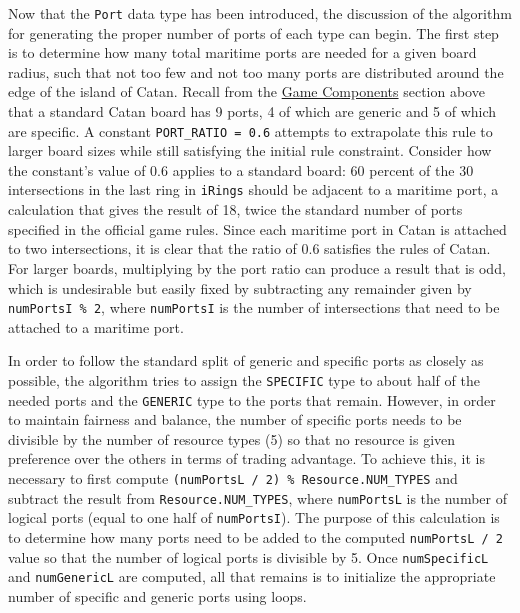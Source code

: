 \documentclass[pageno]{jpaper}
\begin{document}
\begin{doublespacing}
Now that the \lstinline$Port$ data type has been introduced, the discussion of the algorithm for generating the proper number of ports of each type can begin. The first step is to determine how many total maritime ports are needed for a given board radius, such that not too few and not too many ports are distributed around the edge of the island of Catan. Recall from the \hyperlink{sec:game_components}{Game Components} section above that a standard Catan board has 9 ports, 4 of which are generic and 5 of which are specific. A constant \lstinline$PORT_RATIO = 0.6$ attempts to extrapolate this rule to larger board sizes while still satisfying the initial rule constraint. Consider how the constant's value of 0.6 applies to a standard board: 60 percent of the 30 intersections in the last ring in \lstinline$iRings$ should be adjacent to a maritime port, a calculation that gives the result of 18, twice the standard number of ports specified in the official game rules. Since each maritime port in Catan is attached to two intersections, it is clear that the ratio of 0.6 satisfies the rules of Catan. For larger boards, multiplying by the port ratio can produce a result that is odd, which is undesirable but easily fixed by subtracting any remainder given by \lstinline$numPortsI % 2$, where \lstinline$numPortsI$ is the number of intersections that need to be attached to a maritime port.

In order to follow the standard split of generic and specific ports as closely as possible, the algorithm tries to assign the \lstinline$SPECIFIC$ type to about half of the needed ports and the \lstinline$GENERIC$ type to the ports that remain. However, in order to maintain fairness and balance, the number of specific ports needs to be divisible by the number of resource types (5) so that no resource is given preference over the others in terms of trading advantage. To achieve this, it is necessary to first compute \lstinline$(numPortsL / 2) % Resource.NUM_TYPES$ and subtract the result from \lstinline$Resource.NUM_TYPES$, where \lstinline$numPortsL$ is the number of logical ports (equal to one half of \lstinline$numPortsI$). The purpose of this calculation is to determine how many ports need to be added to the computed \lstinline$numPortsL / 2$ value so that the number of logical ports is divisible by 5. Once \lstinline$numSpecificL$ and \lstinline$numGenericL$ are computed, all that remains is to initialize the appropriate number of specific and generic ports using loops.

\hypertarget{sec:the_board_data_type}{}

\end{doublespacing}
\end{document}
